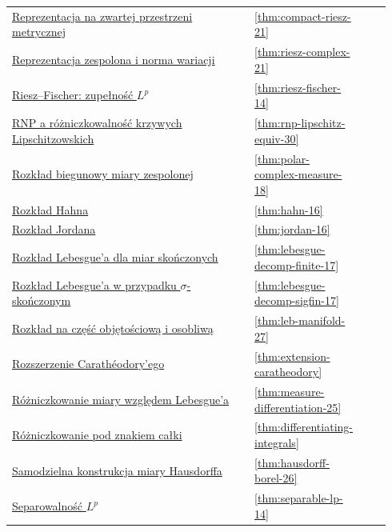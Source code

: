 \documentclass[11pt,a4paper,oneside]{book}
\numberwithin{equation}{chapter}
\theoremstyle{plain}
\theoremstyle{definition}
\theoremstyle{remark}
\begin{document}
\begin{longtable}{@{}p{0.72\linewidth}p{0.135\linewidth}p{0.08\linewidth}@{}}
\hyperref[thm:compact-riesz-21]{Reprezentacja na zwartej przestrzeni metrycznej} & \ref*{thm:compact-riesz-21} & \pageref*{thm:compact-riesz-21} \\
\hyperref[thm:riesz-complex-21]{Reprezentacja zespolona i norma wariacji} & \ref*{thm:riesz-complex-21} & \pageref*{thm:riesz-complex-21} \\
\hyperref[thm:riesz-fischer-14]{Riesz--Fischer: zupełność $L^p$} & \ref*{thm:riesz-fischer-14} & \pageref*{thm:riesz-fischer-14} \\
\hyperref[thm:rnp-lipschitz-equiv-30]{RNP a różniczkowalność krzywych Lipschitzowskich} & \ref*{thm:rnp-lipschitz-equiv-30} & \pageref*{thm:rnp-lipschitz-equiv-30} \\
\hyperref[thm:polar-complex-measure-18]{Rozkład biegunowy miary zespolonej} & \ref*{thm:polar-complex-measure-18} & \pageref*{thm:polar-complex-measure-18} \\
\hyperref[thm:hahn-16]{Rozkład Hahna} & \ref*{thm:hahn-16} & \pageref*{thm:hahn-16} \\
\hyperref[thm:jordan-16]{Rozkład Jordana} & \ref*{thm:jordan-16} & \pageref*{thm:jordan-16} \\
\hyperref[thm:lebesgue-decomp-finite-17]{Rozkład Lebesgue'a dla miar skończonych} & \ref*{thm:lebesgue-decomp-finite-17} & \pageref*{thm:lebesgue-decomp-finite-17} \\
\hyperref[thm:lebesgue-decomp-sigfin-17]{Rozkład Lebesgue'a w przypadku $\sigma$-skończonym} & \ref*{thm:lebesgue-decomp-sigfin-17} & \pageref*{thm:lebesgue-decomp-sigfin-17} \\
\hyperref[thm:leb-manifold-27]{Rozkład na część objętościową i osobliwą} & \ref*{thm:leb-manifold-27} & \pageref*{thm:leb-manifold-27} \\
\hyperref[thm:extension-caratheodory]{Rozszerzenie Carathéodory'ego} & \ref*{thm:extension-caratheodory} & \pageref*{thm:extension-caratheodory} \\
\hyperref[thm:measure-differentiation-25]{Różniczkowanie miary względem Lebesgue'a} & \ref*{thm:measure-differentiation-25} & \pageref*{thm:measure-differentiation-25} \\
\hyperref[thm:differentiating-integrals]{Różniczkowanie pod znakiem całki} & \ref*{thm:differentiating-integrals} & \pageref*{thm:differentiating-integrals} \\
\hyperref[thm:hausdorff-borel-26]{Samodzielna konstrukcja miary Hausdorffa} & \ref*{thm:hausdorff-borel-26} & \pageref*{thm:hausdorff-borel-26} \\
\hyperref[thm:separable-lp-14]{Separowalność $L^p$} & \ref*{thm:separable-lp-14} & \pageref*{thm:separable-lp-14} \\

\end{longtable}
\end{document}
